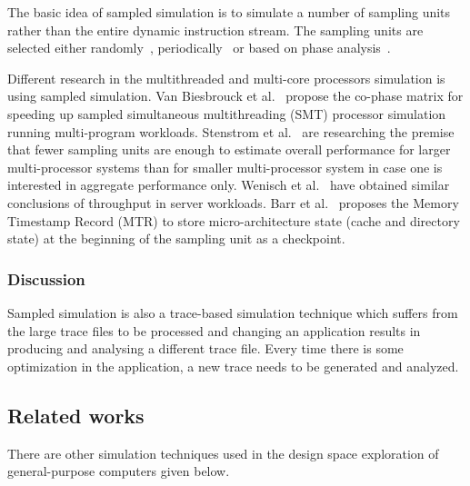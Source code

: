 \documentclass{article}
\begin{document}
The basic idea of sampled simulation is to simulate a number of sampling units
rather than the entire dynamic instruction stream. The sampling units are
selected either randomly~\cite{Conte:1996:RSL:645464.653497},
periodically~\cite{Wunderlich:2003:SAM:871656.859629} or based on phase
analysis~\cite{Sherwood:2002:ACL:635506.605403}. 

Different research in the multithreaded and multi-core processors simulation
is using sampled simulation. Van Biesbrouck et
al.~\cite{VanBiesbrouck:2004:CMG:1153925.1154587} propose the co-phase matrix
for speeding up sampled simultaneous multithreading (SMT) processor
simulation running multi-program workloads. Stenstrom et
al.~\cite{Ekman:2005:EMA:1317536.1318399} are researching the premise that fewer sampling units
are enough to estimate overall performance for larger multi-processor systems
than for smaller multi-processor system in case one is interested in
aggregate performance only. Wenisch et
al.~\cite{Wenisch:2006:SSS:1158826.1159082} have obtained similar conclusions
of throughput in server workloads. Barr et
al.~\cite{Barr:2005:AMS:1317536.1318397} proposes the Memory Timestamp Record
(MTR) to store micro-architecture state (cache and directory state) at the
beginning of the sampling unit as a checkpoint.

\subsubsection*{Discussion}

Sampled simulation is also a trace-based simulation technique which suffers from
the large trace files to be processed and changing an application results in
producing and analysing a different trace file. Every time there is some optimization
in the application, a new trace needs to be generated and analyzed.

\subsection{Related works}

There are other simulation techniques used in the design space exploration of
general-purpose computers given below.
\end{document}
